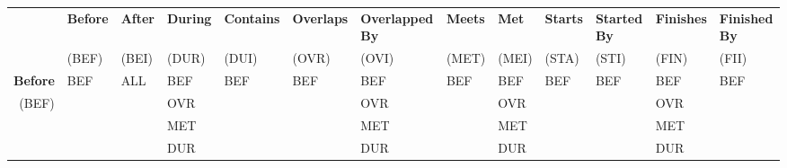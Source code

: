 \documentclass[11pt]{report}
\newenvironment{vvarmargin}[2]
{
  \begin{list}{}
  {
    \setlength{\topsep}{0pt}
    \setlength{\leftmargin}{0pt}
    \setlength{\rightmargin}{0pt}
    \setlength{\listparindent}{\parindent}
    \setlength{\itemindent}{\parindent}
    \setlength{\parsep}{0pt plus 1pt}
    \addtolength{\leftmargin}{#1}\addtolength{\rightmargin}{#2}
  }
  \item
}
{
  \end{list}
}
\begin{document}
          \begin{table}[p]
            \begin{vvarmargin}{-4cm}{-4cm}
              \begin{center}
                \tiny
                \begin{tabular}[t]{|r|l|l|l|l|l|l|l|l|l|l|l|l|}
                  \hline
                                          & \textbf{Before}         & \textbf{After}          & \textbf{During}         & \textbf{Contains}       & \textbf{Overlaps}       & \textbf{Overlapped By}  & \textbf{Meets}          & \textbf{Met}            & \textbf{Starts}         & \textbf{Started By}     & \textbf{Finishes}       & \textbf{Finished By}    \\
                                          & (BEF)                   & (BEI)                   & (DUR)                   & (DUI)                   & (OVR)                   & (OVI)                   & (MET)                   & (MEI)                   & (STA)                   & (STI)                   & (FIN)                   & (FII)                   \\
                  \hline
                  \textbf{Before}         & BEF                     & ALL                     & BEF                     & BEF                     & BEF                     & BEF                     & BEF                     & BEF                     & BEF                     & BEF                     & BEF                     & BEF                     \\
                  (BEF)                   &                         &                         & OVR                     &                         &                         & OVR                     &                         & OVR                     &                         &                         & OVR                     &                         \\
                                          &                         &                         & MET                     &                         &                         & MET                     &                         & MET                     &                         &                         & MET                     &                         \\
                                          &                         &                         & DUR                     &                         &                         & DUR                     &                         & DUR                     &                         &                         & DUR                     &                         \\

\end{tabular}
\end{center}
\end{vvarmargin}
\end{table}
\end{document}
